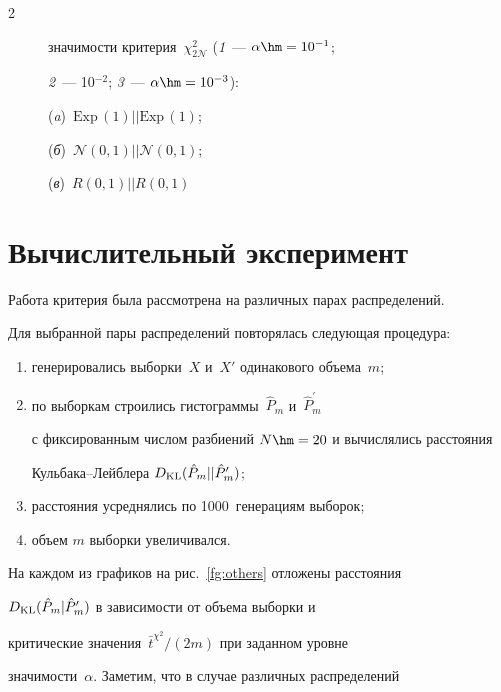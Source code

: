 \begin{multicols}{2}
\begin{figure}[b]
{значимости критерия~$\chi_{2\mathcal{N}}^2$ (\textit{1}~--- $\alpha\hm= 10^{-1}$;

\textit{2}~--- 10$^{-2}$; \textit{3}~--- $\alpha\hm= 10^{-3}$):

(\textit{a})~$\mathrm{Exp}\,(1)||\mathrm{Exp}\,(1)$;

(\textit{б})~$\mathcal{N}(0,1)||\mathcal{N}(0,1)$;

(\textit{в})~$R(0,1)||R(0,1)$\label{fg:alpha}}

\end{figure}





\section{Вычислительный эксперимент}\label{sec:CompExp}



Работа критерия была рассмотрена на различных парах распределений.

Для выбранной пары распределений повторялась следующая процедура:

 \begin{enumerate}[(1)]

 \item генерировались выборки~$X$ и~${X'}$ одинакового объема~$m$;

 \item по выборкам строились гистограммы~$\hat{P}_m$ и~$\hat{P}^\prime_m$

 с фиксированным числом разбиений $N \hm= 20$ и вычислялись расстояния

 Кульбака--Лейблера $D_{\mathrm{KL}}(\hat{P}_m || \hat{P}^\prime_m)$;

     \item расстояния усреднялись по 1000~генерациям выборок;

     \item объем $m$ выборки увеличивался.

     \end{enumerate}

     На каждом из графиков на рис.~\ref{fg:others} отложены рас\-сто\-яния

     $D_{\mathrm{KL}}(\hat{P}_m | \hat{P}^\prime_m)$ в зависимости от объема выборки и

     критические значения~$\bar{t}^{\chi^2}/(2m)$ при заданном уровне

     значимости~$\alpha$. Заметим, что в случае различных распределений


\end{multicols}
